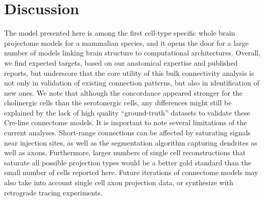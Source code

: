 \section{Discussion}

The model presented here is among the first cell-type specific whole brain projectome models for a mammalian species, and it opens the door for a large number of models linking brain structure to computational architectures. 
Overall, we find expected targets, based on our anatomical expertise and published reports, but underscore that the core utility of this bulk connectivity analysis is not only in validation of existing connection patterns, but also in identification of new ones.
We note that although the concordance appeared stronger for the cholinergic cells than the serotonergic cells, any differences might still be explained by the lack of high quality “ground-truth” datasets to validate these Cre-line connectome models.
It is important to note several limitations of the current analyses.
Short-range connections can be affected by saturating signals near injection sites, as well as the segmentation algorithm capturing dendrites as well as axons.
Furthermore, larger numbers of single cell reconstructions that saturate all possible projection types would be a better gold standard than the small number of cells reported here.
Future iterations of connectome models may also take into account single cell axon projection data, or synthesize with retrograde tracing experiments.


